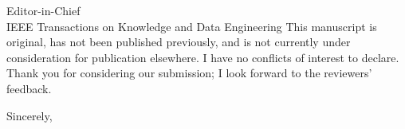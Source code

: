 \documentclass[11pt]{letter}
\begin{document}
\begin{letter}{Editor-in-Chief\\IEEE Transactions on Knowledge and Data Engineering}
This manuscript is original, has not been published previously, and is
not currently under consideration for publication elsewhere. I have no
conflicts of interest to declare. Thank you for considering our
submission; I look forward to the reviewers' feedback.

\closing{Sincerely,}

\end{letter}
\end{document}

